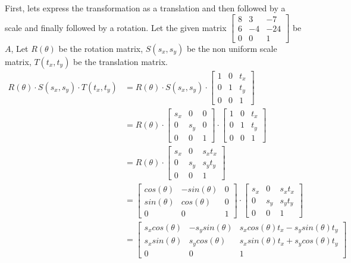 \documentclass{article} %
\begin{document}
First, lets express the transformation as a translation and then followed by a scale and finally followed by a rotation. Let the given matrix $ \left[
\begin{matrix}
8 & 3 & -7\\
6 & -4 & -24\\
0 & 0 & 1
\end{matrix}
\right]$ be $A$,
Let $R(\theta)$ be the rotation matrix, $S(s_x, s_y)$ be the non uniform scale matrix, $T(t_x, t_y)$ be the translation matrix.
\begin{align*}
R(\theta) \cdot S(s_x, s_y) \cdot T(t_x, t_y) &=
R(\theta) \cdot S(s_x, s_y) \cdot
\left[
\begin{matrix}
1 & 0 & t_x\\
0 & 1 & t_y\\
0 & 0 & 1
\end{matrix}
\right]\\
&=
R(\theta) \cdot
\left[
\begin{matrix}
s_x & 0 & 0\\
0 & s_y & 0\\
0 & 0 & 1
\end{matrix}
\right]
\cdot
\left[
\begin{matrix}
1 & 0 & t_x\\
0 & 1 & t_y\\
0 & 0 & 1
\end{matrix}
\right]\\
&=
R(\theta) \cdot
\left[
\begin{matrix}
s_x & 0 & s_x t_x\\
0 & s_y & s_y t_y\\
0 & 0 & 1
\end{matrix}
\right]\\
&= \left[
\begin{matrix}
cos(\theta) & -sin(\theta) & 0\\
sin(\theta) & cos(\theta) & 0\\
0 & 0 & 1
\end{matrix}
\right]
\cdot
\left[
\begin{matrix}
s_x & 0 & s_x t_x\\
0 & s_y & s_y t_y\\
0 & 0 & 1
\end{matrix}
\right]\\
&= \left[
\begin{matrix}
s_x cos(\theta) & - s_y sin(\theta) & s_x cos(\theta) t_x - s_y sin(\theta) t_y\\
s_x sin(\theta) & s_y cos(\theta) & s_x sin(\theta) t_x + s_y cos(\theta) t_y\\
0 & 0 & 1
\end{matrix}
\right]
\end{align*}
\end{document}

